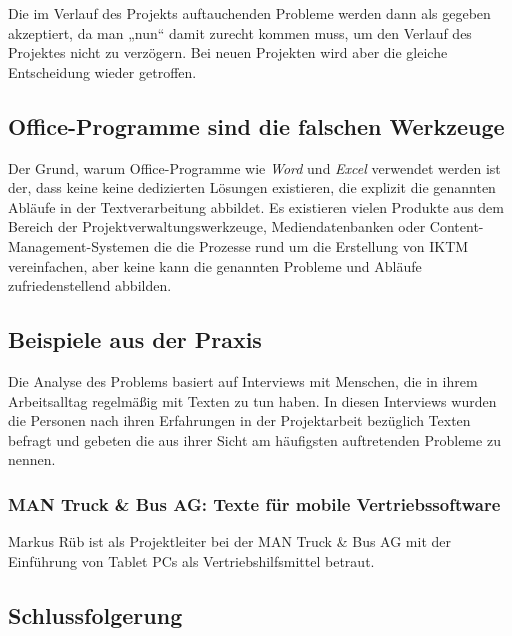 Die im Verlauf des Projekts auftauchenden Probleme werden dann als gegeben akzeptiert, da man „nun“ damit zurecht kommen muss, um den Verlauf des Projektes nicht zu verzögern. Bei neuen Projekten wird aber die gleiche Entscheidung wieder getroffen.

\subsection{Office-Programme sind die falschen Werkzeuge}

Der Grund, warum Office-Programme wie \emph{Word} und \emph{Excel} verwendet werden ist der, dass keine keine dedizierten Lösungen existieren, die explizit die genannten Abläufe in der Textverarbeitung abbildet. Es existieren vielen Produkte aus dem Bereich der Projektverwaltungswerkzeuge, Mediendatenbanken oder Content-Management-Systemen die die Prozesse rund um die Erstellung von \ac{IKTM} vereinfachen, aber keine kann die genannten Probleme und Abläufe zufriedenstellend abbilden.

\subsection{Beispiele aus der Praxis}

Die Analyse des Problems basiert auf Interviews mit Menschen, die in ihrem Arbeitsalltag regelmäßig mit Texten zu tun haben. In diesen Interviews wurden die Personen nach ihren Erfahrungen in der Projektarbeit bezüglich Texten befragt und gebeten die aus ihrer Sicht am häufigsten auftretenden Probleme zu nennen.

\subsubsection{MAN Truck \& Bus AG: Texte für mobile Vertriebssoftware}

Markus Rüb ist als Projektleiter bei der MAN Truck \& Bus AG mit der Einführung von Tablet PCs als Vertriebshilfsmittel betraut.

\subsection{Schlussfolgerung}

